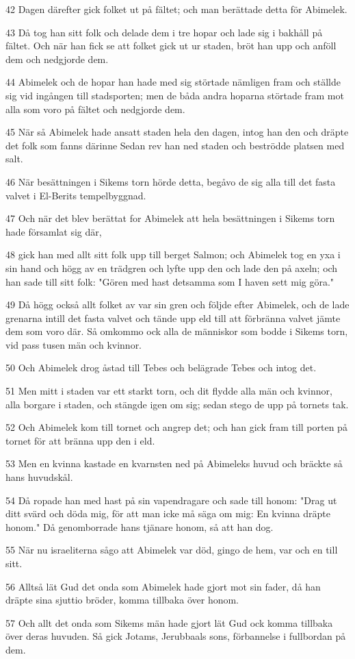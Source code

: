 \par 42 Dagen därefter gick folket ut på fältet; och man berättade detta för Abimelek.
\par 43 Då tog han sitt folk och delade dem i tre hopar och lade sig i bakhåll på fältet. Och när han fick se att folket gick ut ur staden, bröt han upp och anföll dem och nedgjorde dem.
\par 44 Abimelek och de hopar han hade med sig störtade nämligen fram och ställde sig vid ingången till stadsporten; men de båda andra hoparna störtade fram mot alla som voro på fältet och nedgjorde dem.
\par 45 När så Abimelek hade ansatt staden hela den dagen, intog han den och dräpte det folk som fanns därinne Sedan rev han ned staden och beströdde platsen med salt.
\par 46 När besättningen i Sikems torn hörde detta, begåvo de sig alla till det fasta valvet i El-Berits tempelbyggnad.
\par 47 Och när det blev berättat for Abimelek att hela besättningen i Sikems torn hade församlat sig där,
\par 48 gick han med allt sitt folk upp till berget Salmon; och Abimelek tog en yxa i sin hand och högg av en trädgren och lyfte upp den och lade den på axeln; och han sade till sitt folk: "Gören med hast detsamma som I haven sett mig göra."
\par 49 Då högg också allt folket av var sin gren och följde efter Abimelek, och de lade grenarna intill det fasta valvet och tände upp eld till att förbränna valvet jämte dem som voro där. Så omkommo ock alla de människor som bodde i Sikems torn, vid pass tusen män och kvinnor.
\par 50 Och Abimelek drog åstad till Tebes och belägrade Tebes och intog det.
\par 51 Men mitt i staden var ett starkt torn, och dit flydde alla män och kvinnor, alla borgare i staden, och stängde igen om sig; sedan stego de upp på tornets tak.
\par 52 Och Abimelek kom till tornet och angrep det; och han gick fram till porten på tornet för att bränna upp den i eld.
\par 53 Men en kvinna kastade en kvarnsten ned på Abimeleks huvud och bräckte så hans huvudskål.
\par 54 Då ropade han med hast på sin vapendragare och sade till honom: "Drag ut ditt svärd och döda mig, för att man icke må säga om mig: En kvinna dräpte honom." Då genomborrade hans tjänare honom, så att han dog.
\par 55 När nu israeliterna sågo att Abimelek var död, gingo de hem, var och en till sitt.
\par 56 Alltså lät Gud det onda som Abimelek hade gjort mot sin fader, då han dräpte sina sjuttio bröder, komma tillbaka över honom.
\par 57 Och allt det onda som Sikems män hade gjort lät Gud ock komma tillbaka över deras huvuden. Så gick Jotams, Jerubbaals sons, förbannelse i fullbordan på dem.

